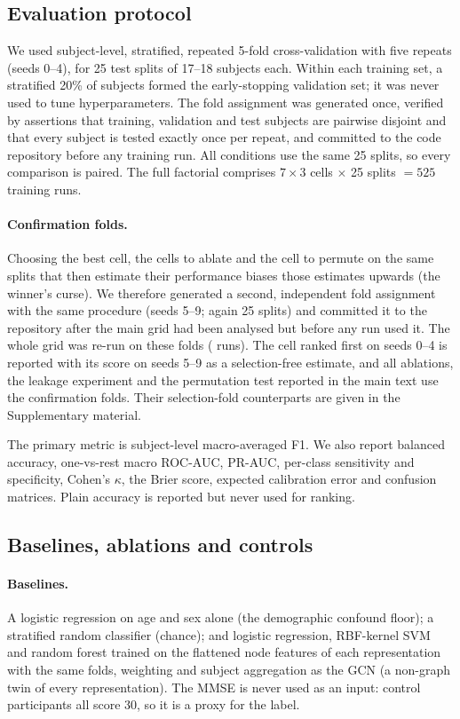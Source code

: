 \subsection{Evaluation protocol}\label{sec:protocol}
We used subject-level, stratified, repeated 5-fold cross-validation with five repeats (seeds 0--4),
for 25 test splits of 17--18 subjects each. Within each training set, a stratified 20\% of subjects
formed the early-stopping validation set; it was never used to tune hyperparameters. The fold
assignment was generated once, verified by assertions that training, validation and test subjects
are pairwise disjoint and that every subject is tested exactly once per repeat, and committed to the
code repository before any training run. All conditions use the same 25 splits, so every comparison
is paired. The full factorial comprises $7\times3$ cells $\times$ 25 splits $=525$ training runs.

\paragraph{Confirmation folds.} Choosing the best cell, the cells to ablate and the cell to
permute on the same splits that then estimate their performance biases those estimates upwards
(the winner's curse). We therefore generated a second, independent fold assignment with the same
procedure (seeds 5--9; again 25 splits) and committed it to the repository after the main grid had
been analysed but before any run used it. The whole grid was re-run on these folds
(\nConfirmGridRuns{} runs). The cell ranked first on seeds 0--4 is reported with its score on seeds
5--9 as a selection-free estimate, and all ablations, the leakage experiment and the permutation
test reported in the main text use the confirmation folds. Their selection-fold counterparts are
given in the Supplementary material.

The primary metric is subject-level macro-averaged F1. We also report balanced accuracy, one-vs-rest
macro ROC-AUC, PR-AUC, per-class sensitivity and specificity, Cohen's $\kappa$, the Brier score,
expected calibration error and confusion matrices. Plain accuracy is reported but never used for
ranking.

\subsection{Baselines, ablations and controls}\label{sec:ablations}
\paragraph{Baselines.} A logistic regression on age and sex alone (the demographic confound floor);
a stratified random classifier (chance); and logistic regression, RBF-kernel SVM and random forest
trained on the flattened node features of each representation with the same folds, weighting and
subject aggregation as the GCN (a non-graph twin of every representation). The MMSE is never used as
an input: control participants all score 30, so it is a proxy for the label.

